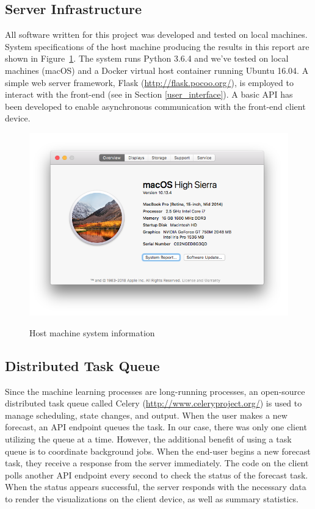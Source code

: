 \documentclass[11pt, oneside]{report}
\begin{document}
\subsection{Server Infrastructure}
All software written for this project was developed and tested on local machines. System specifications of the host machine producing the results in this report are shown in Figure~\ref{fig:System_Specs}. The system runs Python 3.6.4 and we've tested on local machines (macOS) and a Docker virtual host container running Ubuntu 16.04. A simple web server framework, Flask (\url{http://flask.pocoo.org/}), is employed to interact with the front-end (see in Section \ref{user_interface}). A basic API has been developed to enable asynchronous communication with the front-end client device.

\begin{figure}[h]
  \caption{Host machine system information}
  \centering
  \includegraphics[width=12.5cm]{images/System_Specs.png}
  \label{fig:System_Specs}
\end{figure}

\subsection{Distributed Task Queue}
Since the machine learning processes are long-running processes, an open-source distributed task queue called Celery (\url{http://www.celeryproject.org/}) is used to manage scheduling, state changes, and output. When the user makes a new forecast, an API endpoint queues the task. In our case, there was only one client utilizing the queue at a time. However, the additional benefit of using a task queue is to coordinate background jobs. When the end-user begins a new forecast task, they receive a response from the server immediately. The code on the client polls another API endpoint every second to check the status of the forecast task. When the status appears successful, the server responds with the necessary data to render the visualizations on the client device, as well as summary statistics.
\end{document}
